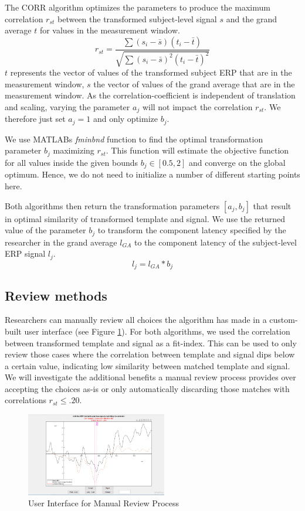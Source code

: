 \documentclass[
  man,floatsintext]{apa7}
\begin{document}
The CORR algorithm optimizes the parameters to produce the maximum correlation \(r_{st}\) between the transformed subject-level signal \(s\) and the grand average \(t\) for values in the measurement window.
\[r_{st} = \frac{\sum(s_i - \bar{s})(t_{i} - \bar{t})}{\sqrt{\sum(s_i - \bar{s})^2(t_{i} - \bar{t})^2}}\]
\(t\) represents the vector of values of the transformed subject ERP that are in the measurement window, \(s\) the vector of values of the grand average that are in the measurement window. As the correlation-coefficient is independent of translation and scaling, varying the parameter \(a_j\) will not impact the correlation \(r_{st}\). We therefore just set \(a_j = 1\) and only optimize \(b_j\).

We use MATLABs \emph{fminbnd} function to find the optimal transformation parameter \(b_j\) maximizing \(r_{st}\). This function will estimate the objective function for all values inside the given bounds \(b_j \in [0.5, 2]\) and converge on the global optimum. Hence, we do not need to initialize a number of different starting points here.

Both algorithms then return the transformation parameters \([a_j, b_j]\) that result in optimal similarity of transformed template and signal. We use the returned value of the parameter \(b_j\) to transform the component latency specified by the researcher in the grand average \(l_{GA}\) to the component latency of the subject-level ERP signal \(l_j\).
\[ l_j = l_{GA} * b_j \]

\hypertarget{review-methods}{%
\subsection{Review methods}\label{review-methods}}

Researchers can manually review all choices the algorithm has made in a custom-built user interface (see Figure \ref{fig:review-gui-example}). For both algorithms, we used the correlation between transformed template and signal as a fit-index. This can be used to only review those cases where the correlation between template and signal dips below a certain value, indicating low similarity between matched template and signal. We will investigate the additional benefits a manual review process provides over accepting the choices as-is or only automatically discarding those matches with correlations \(r_{st} \le .20\).



\begin{figure}
\includegraphics[width=2.42in]{images/review_gui_example} \caption{User Interface for Manual Review Process}\label{fig:review-gui-example}
\end{figure}
\end{document}
